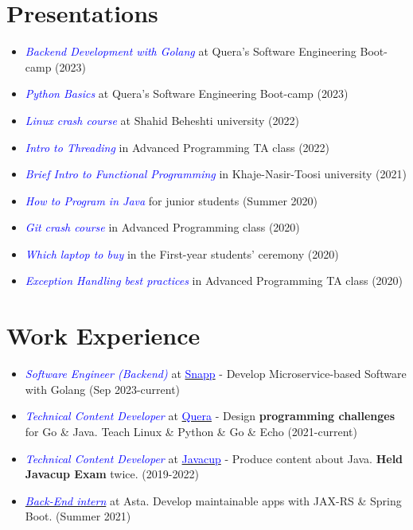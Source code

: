 \documentclass[11pt,a4paper,sans]{moderncv}
\begin{document}

\pagebreak
\section{Presentations}
\begin{itemize}
\item \textit{\textcolor{blue}{Backend Development with Golang}} at Quera's Software Engineering Boot-camp (2023)
\item \textit{\textcolor{blue}{Python Basics}} at Quera's Software Engineering Boot-camp (2023)
\item \textit{\textcolor{blue}{Linux crash course}} at Shahid Beheshti university (2022)
\item \textit{\textcolor{blue}{Intro to Threading}} in Advanced Programming TA class (2022)
\item \textit{\textcolor{blue}{Brief Intro to Functional Programming}} in Khaje-Nasir-Toosi university (2021)
\item \textit{\textcolor{blue}{How to Program in Java}} for junior students (Summer 2020)
\item \textit{\textcolor{blue}{Git crash course}} in Advanced Programming class  (2020)
\item \textit{\textcolor{blue}{Which laptop to buy}} in the First-year students' ceremony (2020)
\item \textit{\textcolor{blue}{Exception Handling best practices}} in Advanced Programming TA class (2020)
\end{itemize}




\vspace{-0.4em}
\section{Work Experience}
\begin{itemize}

\item \textit{\textcolor{blue}{Software Engineer (Backend)}} at \href{https://snapp.ir/about}{\textcolor{blue}{Snapp}} - Develop Microservice-based Software with Golang (Sep 2023-current)

\item \textit{\textcolor{blue}{Technical Content Developer}} at \href{https://quera.org}{\textcolor{blue}{Quera}} - Design \textbf{programming challenges} for Go \& Java. Teach Linux \& Python \& Go \& Echo (2021-current)

\item \textit{\textcolor{blue}{Technical Content Developer}} at {\href{https://javacup.ir}{\textcolor{blue}{Javacup}}} - Produce content about Java. \textbf{Held Javacup Exam} twice. (2019-2022)

\item \textit{{\href{https://asta.ir}{\textcolor{blue}{Back-End intern}}}} at Asta. Develop maintainable apps with JAX-RS \& Spring Boot. (Summer 2021)
\end{itemize}
\end{document}
